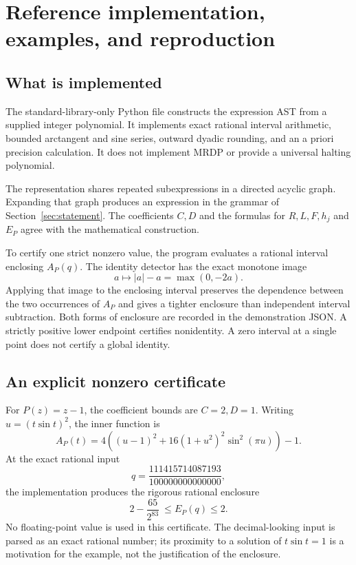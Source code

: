 \section{Reference implementation, examples, and reproduction}
\label{app:artifacts}

\subsection{What is implemented}

The standard-library-only Python file  constructs
the expression AST from a supplied integer polynomial. It implements
exact rational interval arithmetic, bounded arctangent and sine series,
outward dyadic rounding, and an a priori precision calculation. It does
not implement MRDP or provide a universal halting polynomial.

The representation shares repeated subexpressions in a directed acyclic
graph. Expanding that graph produces an expression in the grammar of
Section~\ref{sec:statement}. The coefficients $C,D$ and the formulas for
$R,L,F,h_j$ and $E_P$ agree with the mathematical construction.

To certify one strict nonzero value, the program evaluates a rational
interval enclosing $A_P(q)$. The identity detector has the exact monotone
image
\[
 a\longmapsto |a|-a=\max(0,-2a).
\]
Applying that image to the enclosing interval preserves the dependence
between the two occurrences of $A_P$ and gives a tighter enclosure than
independent interval subtraction. Both forms of enclosure are recorded
in the demonstration JSON. A strictly positive lower endpoint certifies
nonidentity. A zero interval at a single point does not certify a global
identity.

\subsection{An explicit nonzero certificate}

For $P(z)=z-1$, the coefficient bounds are $C=2,D=1$. Writing
$u=(t\sin t)^2$, the inner function is
\[
 A_P(t)=4\left((u-1)^2+
     16(1+u^2)^2\sin^2(\pi u)\right)-1.
\]
At the exact rational input
\[
 q=\frac{111415714087193}{100000000000000},
\]
the implementation produces the rigorous rational enclosure
\begin{equation}\label{eq:example-certificate}
 2-\frac{65}{2^{83}}\ \le E_P(q)\le2.
\end{equation}
No floating-point value is used in this certificate. The decimal-looking
input is parsed as an exact rational number; its proximity to a solution
of $t\sin t=1$ is a motivation for the example, not the justification
of the enclosure.

